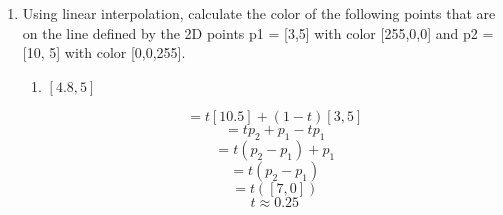 \documentclass{article}
\begin{document}
\begin{enumerate}
\begin{enumerate}
                \item 
                    \begin{lstlisting}[language=c]
main() {
  gl_FragColor = vec4(0.0, 0.0, 1.0, 1.0);
} 
                    \end{lstlisting}

                    \begin{mdframed}
                       This is a fragment shader. This
                       is obvious by the usage of
                       "gl\_FragColor" as well as the
                       lack of attribute declarations.
                    \end{mdframed}
            \end{enumerate}

            \break
        \item Using linear interpolation, calculate the color of the following points that are on the
            line defined by the 2D points p1 = [3,5] with color [255,0,0] and p2 = [10, 5] with
            color [0,0,255].
            \begin{enumerate}
                \item $[4.8, 5]$
                    \begin{mdframed}
                        \begin{displaymath}
                            [4.8, 5] = t[10.5] + (1-t)[3, 5]
                        \end{displaymath}
                        \begin{displaymath}
                            [4.8, 5] = tp_2 + p_1 - tp_1
                        \end{displaymath}
                        \begin{displaymath}
                            [4.8, 5] = t(p_2 - p_1) + p_1
                        \end{displaymath}
                        \begin{displaymath}
                            [1.8, 0] = t(p_2 - p_1)
                        \end{displaymath}
                        \begin{displaymath}
                            [1.8, 0] = t([7,0])
                        \end{displaymath}
                        \begin{displaymath}
                            t \approx 0.25
                        \end{displaymath}


\end{mdframed}
\end{enumerate}
\end{enumerate}
\end{document}
